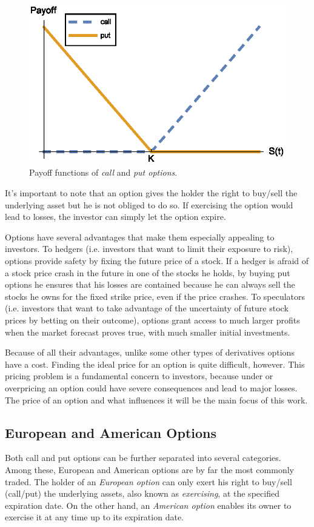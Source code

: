 \documentclass[a4paper,prd,twocolumn,nofootinbib,superscriptaddress,floatfix]{revtex4}
\begin{document}
\begin{figure}[H]
    \centering
      \includegraphics[width=.8\columnwidth]{Payoff.eps}
      \caption{Payoff functions of \textit{call} and \textit{put options}.}\label{fig:Payoff}
    \end{figure}

It's important to note that an option gives the holder the right to buy/sell the underlying asset but he is not obliged to do so. If exercising the option would lead to losses, the investor can simply let the option expire.



Options have several advantages that make them especially appealing to investors.
To hedgers (i.e. investors that want to limit their exposure to risk), options provide safety by fixing the future price of a stock. If a hedger is afraid of a stock price crash in the future in one of the stocks he holds, by buying put options he ensures that his losses are contained because he can always sell the stocks he owns for the fixed strike price, even if the price crashes.
To speculators (i.e. investors that want to take advantage of the uncertainty of future stock prices by betting on their outcome), options grant access to much larger profits when the market forecast proves true, with much smaller initial investments.


Because of all their advantages, unlike some other types of derivatives options have a cost. Finding the ideal price for an option is quite difficult, however. This pricing problem is a fundamental concern to investors, because under or overpricing an option could have severe consequences and lead to major losses.
The price of an option and what influences it will be the main focus of this work.




\subsection{European and American Options}
Both call and put options can be further separated into several categories. Among these, European and American options are by far the most commonly traded.
The holder of an \textit{European option} can only exert his right to buy/sell (call/put) the underlying assets, also known as \textit{exercising}, at the specified expiration date.
On the other hand, an \textit{American option} enables its owner to exercise it at any time up to its expiration date.
\end{document}
